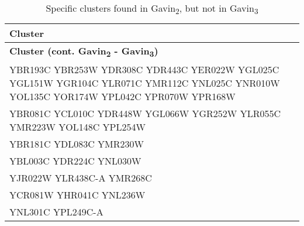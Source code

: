 \setlength{\extrarowheight}{2pt}
\renewcommand{\arraystretch}{1.2}
\begin{longtable}{| m{27em} |}
\caption{Specific clusters found in Gavin\textsubscript{2}, but not in Gavin\textsubscript{3}} \\
\hline
\textbf{Cluster} \\
\hline
\endfirsthead
\hline
\textbf{Cluster (cont. Gavin\textsubscript{2} - Gavin\textsubscript{3})} \\
\hline
\endhead
\hline
\endfoot
\hline
\endlastfoot
YBR193C YBR253W YDR308C YDR443C YER022W YGL025C YGL151W YGR104C YLR071C YMR112C YNL025C YNR010W YOL135C YOR174W YPL042C YPR070W YPR168W \\
\hline
YBR081C YCL010C YDR448W YGL066W YGR252W YLR055C YMR223W YOL148C YPL254W \\
\hline
YBR181C YDL083C YMR230W \\
\hline
YBL003C YDR224C YNL030W \\
\hline
YJR022W YLR438C-A YMR268C \\
\hline
YCR081W YHR041C YNL236W \\
\hline
YNL301C YPL249C-A \\
\hline
\end{longtable}